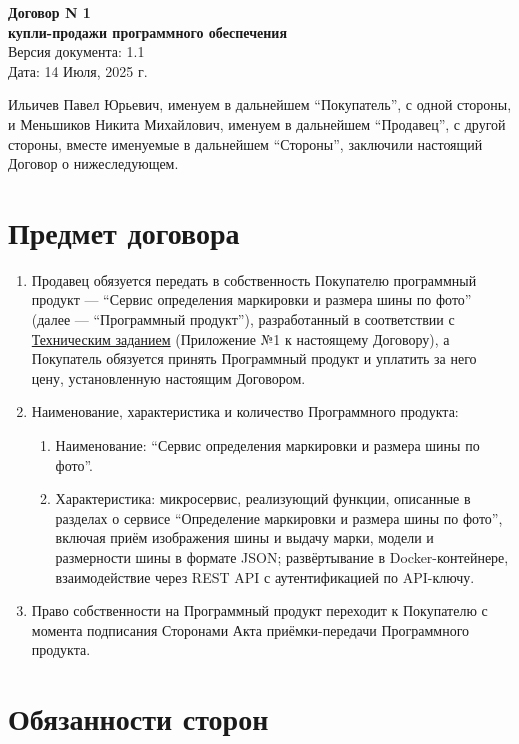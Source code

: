 \documentclass[12pt]{article}
\newcommand{\TZ}[1][Техническое задание]{\hyperref[link-tz]{#1}}
\begin{document}
\begin{center}
    {\Large \textbf{Договор N 1 \\ купли-продажи программного обеспечения}} \\[0.5em]
    Версия документа: 1.1 \\
    Дата: 14 Июля, 2025 г.
\end{center}

\noindent
Ильичев Павел Юрьевич, именуем в дальнейшем ``Покупатель'', с одной стороны, и Меньшиков Никита Михайлович, именуем в дальнейшем ``Продавец'', с другой стороны, вместе именуемые в дальнейшем ``Стороны'', заключили настоящий Договор о нижеследующем.

\section{Предмет договора}

\begin{enumerate}
    \item Продавец обязуется передать в собственность Покупателю программный продукт — ``Сервис определения маркировки и размера шины по фото'' (далее — ``Программный продукт''), разработанный в соответствии с \TZ[Техническим заданием] (Приложение №1 к настоящему Договору), а Покупатель обязуется принять Программный продукт и уплатить за него цену, установленную настоящим Договором.

    \item Наименование, характеристика и количество Программного продукта:
          \begin{enumerate}
              \item Наименование: ``Сервис определения маркировки и размера шины по фото''.
              \item Характеристика: микросервис, реализующий функции, описанные в разделах о сервисе ``Определение маркировки и размера шины по фото'', включая приём изображения шины и выдачу марки, модели и размерности шины в формате JSON; развёртывание в Docker-контейнере, взаимодействие через REST API с аутентификацией по API-ключу.
          \end{enumerate}

    \item Право собственности на Программный продукт переходит к Покупателю с момента подписания Сторонами Акта приёмки-передачи Программного продукта.
\end{enumerate}

\section{Обязанности сторон}
\end{document}
